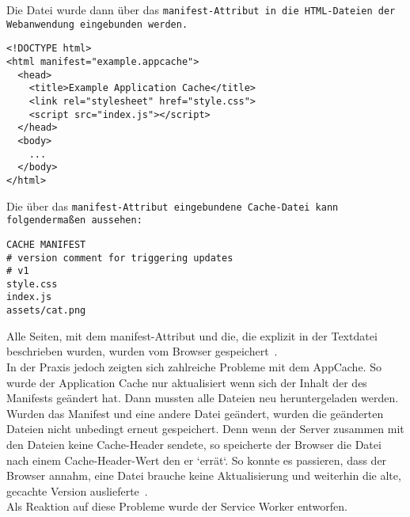 Die Datei wurde dann über das \tt{manifest}-Attribut in die \gls{HTML}-Dateien der Webanwendung eingebunden werden.
\begin{lstlisting}
<!DOCTYPE html>
<html manifest="example.appcache">
  <head>
    <title>Example Application Cache</title>
    <link rel="stylesheet" href="style.css">
    <script src="index.js"></script>
  </head>
  <body>
    ...
  </body>
</html>
\end{lstlisting}
Die über das \tt{manifest}-Attribut eingebundene Cache-Datei kann folgendermaßen aussehen:
\begin{lstlisting}
CACHE MANIFEST
# version comment for triggering updates
# v1
style.css
index.js
assets/cat.png
\end{lstlisting}
Alle Seiten, mit dem manifest-Attribut und die, die explizit in der Textdatei beschrieben wurden, wurden vom Browser gespeichert~\cite{appcache}.\\
In der Praxis jedoch zeigten sich zahlreiche Probleme mit dem AppCache. So wurde der Application Cache nur aktualisiert wenn sich der Inhalt der des Manifests geändert hat. Dann mussten alle Dateien neu heruntergeladen werden.
Wurden das Manifest und eine andere Datei geändert, wurden die geänderten Dateien nicht unbedingt erneut gespeichert. Denn wenn der Server zusammen mit den Dateien keine Cache-Header sendete, so speicherte der Browser die Datei nach einem Cache-Header-Wert den er `errät`. So konnte es passieren, dass der Browser annahm, eine Datei brauche keine Aktualisierung und weiterhin die alte, gecachte Version auslieferte~\cite{noappcache}.\\
Als Reaktion auf diese Probleme wurde der Service Worker entworfen.

